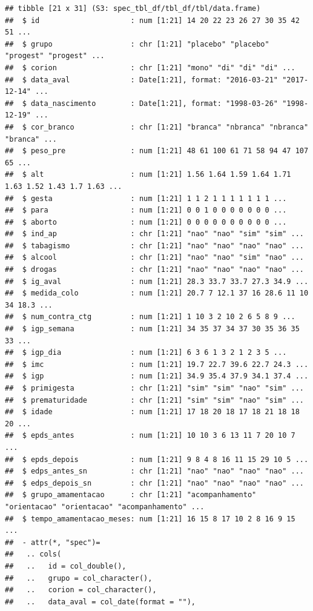 \documentclass[
]{book}
\begin{document}
\begin{verbatim}
## tibble [21 x 31] (S3: spec_tbl_df/tbl_df/tbl/data.frame)
##  $ id                     : num [1:21] 14 20 22 23 26 27 30 35 42 51 ...
##  $ grupo                  : chr [1:21] "placebo" "placebo" "progest" "progest" ...
##  $ corion                 : chr [1:21] "mono" "di" "di" "di" ...
##  $ data_aval              : Date[1:21], format: "2016-03-21" "2017-12-14" ...
##  $ data_nascimento        : Date[1:21], format: "1998-03-26" "1998-12-19" ...
##  $ cor_branco             : chr [1:21] "branca" "nbranca" "nbranca" "branca" ...
##  $ peso_pre               : num [1:21] 48 61 100 61 71 58 94 47 107 65 ...
##  $ alt                    : num [1:21] 1.56 1.64 1.59 1.64 1.71 1.63 1.52 1.43 1.7 1.63 ...
##  $ gesta                  : num [1:21] 1 1 2 1 1 1 1 1 1 1 ...
##  $ para                   : num [1:21] 0 0 1 0 0 0 0 0 0 0 ...
##  $ aborto                 : num [1:21] 0 0 0 0 0 0 0 0 0 0 ...
##  $ ind_ap                 : chr [1:21] "nao" "nao" "sim" "sim" ...
##  $ tabagismo              : chr [1:21] "nao" "nao" "nao" "nao" ...
##  $ alcool                 : chr [1:21] "nao" "nao" "sim" "nao" ...
##  $ drogas                 : chr [1:21] "nao" "nao" "nao" "nao" ...
##  $ ig_aval                : num [1:21] 28.3 33.7 33.7 27.3 34.9 ...
##  $ medida_colo            : num [1:21] 20.7 7 12.1 37 16 28.6 11 10 34 18.3 ...
##  $ num_contra_ctg         : num [1:21] 1 10 3 2 10 2 6 5 8 9 ...
##  $ igp_semana             : num [1:21] 34 35 37 34 37 30 35 36 35 33 ...
##  $ igp_dia                : num [1:21] 6 3 6 1 3 2 1 2 3 5 ...
##  $ imc                    : num [1:21] 19.7 22.7 39.6 22.7 24.3 ...
##  $ igp                    : num [1:21] 34.9 35.4 37.9 34.1 37.4 ...
##  $ primigesta             : chr [1:21] "sim" "sim" "nao" "sim" ...
##  $ prematuridade          : chr [1:21] "sim" "sim" "nao" "sim" ...
##  $ idade                  : num [1:21] 17 18 20 18 17 18 21 18 18 20 ...
##  $ epds_antes             : num [1:21] 10 10 3 6 13 11 7 20 10 7 ...
##  $ epds_depois            : num [1:21] 9 8 4 8 16 11 15 29 10 5 ...
##  $ edps_antes_sn          : chr [1:21] "nao" "nao" "nao" "nao" ...
##  $ edps_depois_sn         : chr [1:21] "nao" "nao" "nao" "nao" ...
##  $ grupo_amamentacao      : chr [1:21] "acompanhamento" "orientacao" "orientacao" "acompanhamento" ...
##  $ tempo_amamentacao_meses: num [1:21] 16 15 8 17 10 2 8 16 9 15 ...
##  - attr(*, "spec")=
##   .. cols(
##   ..   id = col_double(),
##   ..   grupo = col_character(),
##   ..   corion = col_character(),
##   ..   data_aval = col_date(format = ""),

\end{verbatim}
\end{document}
